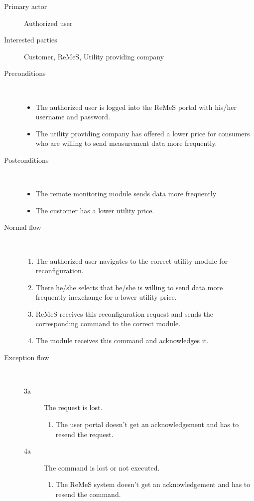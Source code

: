 \begin{description}
	\item[Primary actor] Authorized user
	\item[Interested parties] Customer, ReMeS, Utility providing company
	\item[Preconditions] \ 
	\begin{itemize}
		\item The authorized user is logged into the ReMeS portal with his/her
		username and password.
		\item The utility providing company has offered a lower price for consumers
		who are willing to send measurement data more frequently.
	\end{itemize}
	\item[Postconditions] \ 
	\begin{itemize}
		\item The remote monitoring module sends data more frequently
		\item The customer has a lower utility price.
	\end{itemize}
	\item[Normal flow] \ 
	\begin{enumerate}
	  	\item The authorized user navigates to the correct utility module for
	  	reconfiguration.
	  	\item There he/she selects that he/she is willing to send data more
	  	frequently inexchange for a lower utility price.
	  	\item ReMeS receives this reconfiguration request and sends the
	  	corresponding command to the correct module.
	  	\item The module receives this command and acknowledges it.
	\end{enumerate}
	\item[Exception flow] \ 
	\begin{description}
		\item[3a] The request is lost.
		\begin{enumerate}
		  \item The user portal doesn't get an acknowledgement and has to resend the
		  request.
		\end{enumerate}
		\item[4a] The command is lost or not executed.
		\begin{enumerate}
		  \item The ReMeS system doesn't get an acknowledgement and has to resend the
		  command.
		 \end{enumerate}
	\end{description}
\end{description}